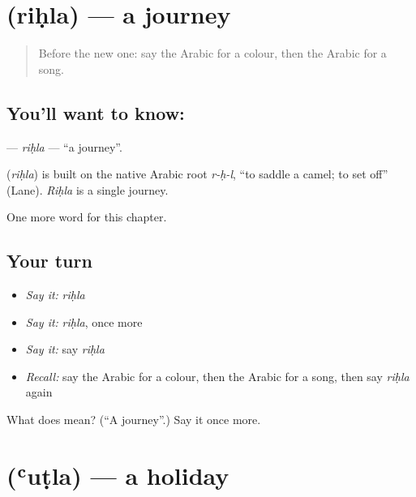 \section[\texorpdfstring{\ar{رحلة} (riḥla)}{رحلة (riḥla)}]{ (riḥla) — a journey}

\label{lesson:AR-C98-rihla}



\begin{quote}
Before the new one: say the Arabic for a colour, then the Arabic for a song.
\end{quote}

\subsection*{You'll want to know: }
\textbf{} — \emph{riḥla} — \textquotedblleft{}a journey\textquotedblright{}.

\begin{cousinweb}
\textbf{} (\emph{riḥla}) is built on the native Arabic root \emph{r-ḥ-l}, \textquotedblleft{}to saddle a camel; to set off\textquotedblright{} (Lane). \emph{Riḥla} is a single journey.
\end{cousinweb}

\begin{grammarlens}[title={What you've built}]
One more word for this chapter.
\end{grammarlens}

\subsection*{Your turn}
\begin{itemize}
\raggedright
  \item \emph{Say it:} \emph{riḥla}
  \item \emph{Say it:} \emph{riḥla}, once more
  \item \emph{Say it:} say \emph{riḥla}
  \item \emph{Recall:} say the Arabic for a colour, then the Arabic for a song, then say \emph{riḥla} again
\end{itemize}

\begin{tcolorbox}[breakable,colback=teal!4,colframe=teal!35!black,title={Before you move on}]
What does  mean? (\textquotedblleft{}A journey\textquotedblright{}.) Say it once more.
\end{tcolorbox}
\section[\texorpdfstring{\ar{عطلة} (ʿuṭla)}{عطلة (ʿuṭla)}]{ (ʿuṭla) — a holiday}

